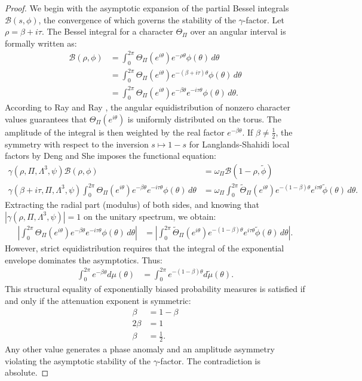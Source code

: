 \documentclass[
]{article}
\begin{document}
\begin{proof}
We begin with the asymptotic expansion of the partial Bessel integrals $\mathcal{B}(s, \phi)$, the convergence of which governs the stability of the $\gamma$-factor. Let $\rho = \beta + i\tau$. The Bessel integral for a character $\Theta_{\Pi}$ over an angular interval is formally written as:
\begin{align*}
\mathcal{B}(\rho, \phi) &= \int_{0}^{2\pi} \Theta_{\Pi}(e^{i\theta}) e^{-\rho \theta} \phi(\theta) \, d\theta \\
&= \int_{0}^{2\pi} \Theta_{\Pi}(e^{i\theta}) e^{-(\beta + i\tau) \theta} \phi(\theta) \, d\theta \\
&= \int_{0}^{2\pi} \Theta_{\Pi}(e^{i\theta}) e^{-\beta \theta} e^{-i\tau \theta} \phi(\theta) \, d\theta.
\end{align*}
According to Ray and Ray \cite{ray2026average}, the angular equidistribution of nonzero character values guarantees that $\Theta_{\Pi}(e^{i\theta})$ is uniformly distributed on the torus. The amplitude of the integral is then weighted by the real factor $e^{-\beta \theta}$. If $\beta \neq \frac{1}{2}$, the symmetry with respect to the inversion $s \mapsto 1-s$ for Langlands-Shahidi local factors by Deng and She \cite{deng2026stability} imposes the functional equation:
\begin{align*}
\gamma(\rho, \Pi, \Lambda^3, \psi) \mathcal{B}(\rho, \phi) &= \omega_{\Pi} \mathcal{B}(1-\rho, \tilde{\phi}) \\
\gamma(\beta + i\tau, \Pi, \Lambda^3, \psi) \int_{0}^{2\pi} \Theta_{\Pi}(e^{i\theta}) e^{-\beta \theta} e^{-i\tau \theta} \phi(\theta) \, d\theta &= \omega_{\Pi} \int_{0}^{2\pi} \tilde{\Theta}_{\Pi}(e^{i\theta}) e^{-(1-\beta) \theta} e^{i\tau \theta} \tilde{\phi}(\theta) \, d\theta.
\end{align*}
Extracting the radial part (modulus) of both sides, and knowing that $|\gamma(\rho, \Pi, \Lambda^3, \psi)| = 1$ on the unitary spectrum, we obtain:
\begin{align*}
\left| \int_{0}^{2\pi} \Theta_{\Pi}(e^{i\theta}) e^{-\beta \theta} e^{-i\tau \theta} \phi(\theta) \, d\theta \right| &= \left| \int_{0}^{2\pi} \tilde{\Theta}_{\Pi}(e^{i\theta}) e^{-(1-\beta) \theta} e^{i\tau \theta} \tilde{\phi}(\theta) \, d\theta \right|.
\end{align*}
However, strict equidistribution requires that the integral of the exponential envelope dominates the asymptotics. Thus:
\begin{align*}
\int_{0}^{2\pi} e^{-\beta \theta} d\mu(\theta) &= \int_{0}^{2\pi} e^{-(1-\beta) \theta} d\tilde{\mu}(\theta).
\end{align*}
This structural equality of exponentially biased probability measures is satisfied if and only if the attenuation exponent is symmetric:
\begin{align*}
\beta &= 1 - \beta \\
2\beta &= 1 \\
\beta &= \frac{1}{2}.
\end{align*}
Any other value generates a phase anomaly and an amplitude asymmetry violating the asymptotic stability of the $\gamma$-factor. The contradiction is absolute.
\end{proof}
\end{document}
